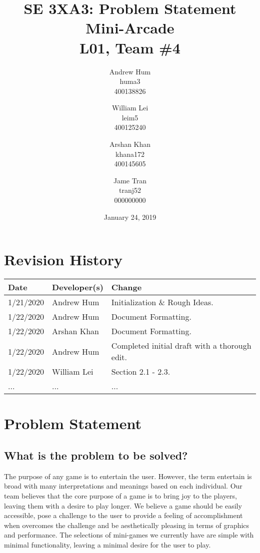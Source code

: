 \documentclass{article}
\title{SE 3XA3: Problem Statement \\ Mini-Arcade \\{\large L01, Team \#4}}
\author{Andrew Hum \\ huma3 \\ 400138826 \and
		William Lei \\ leim5 \\ 400125240 \and
		Arshan Khan \\ khana172 \\ 400145605 \and
		Jame Tran \\ tranj52 \\ 000000000
}
\date{January 24, 2019}
\begin{document}
\maketitle
\newpage

\tableofcontents
\newpage



\begin{table}[hp]
\section{Revision History} \label{TblRevisionHistory}
\begin{tabularx}{\textwidth}{llX}
\hline
\textbf{Date} & \textbf{Developer(s)} & \textbf{Change}\\
\hline
1/21/2020 & Andrew Hum & Initialization \& Rough Ideas.\\
\hline
1/22/2020 & Andrew Hum  & Document Formatting.\\
\hline
1/22/2020 & Arshan Khan & Document Formatting.\\
\hline
1/22/2020 & Andrew Hum & Completed initial draft with a thorough edit. \\
\hline
1/22/2020 & William Lei & Section 2.1 - 2.3.\\
\hline
... & ... & ...\\
\hline
\end{tabularx}
\end{table}

\newpage

\section{Problem Statement}
\subsection{What is the problem to be solved?}
The purpose of any game is to entertain the user. However, the term entertain is broad with many interpretations and meanings based on each individual. Our team believes that the core purpose of a game is to bring joy to the players, leaving them with a desire to play longer. We believe a game should be easily accessible, pose a challenge to the user to provide a feeling of accomplishment when overcomes the challenge and be aesthetically pleasing in terms of graphics and performance. The selections of mini-games we currently have are simple with minimal functionality, leaving a minimal desire for the user to play.
\end{document}

